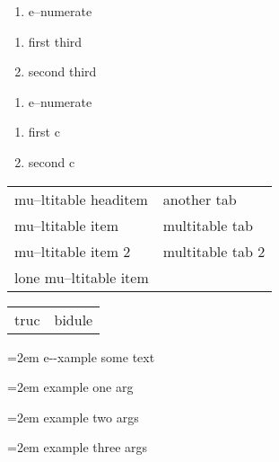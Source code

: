 \documentclass{book}
\begin{document}
\begin{titlepage}
\begin{enumerate}[start=1]
\item e--numerate
\end{enumerate}

\begin{enumerate}[start=3]
\item first third
\item second third
\end{enumerate}

\begin{enumerate}[label=\alph*.]
\item e--numerate
\end{enumerate}

\begin{enumerate}[label=\alph*.,start=3]
\item first c
\item second c
\end{enumerate}

\begin{tabular}{m{} m{}}%
mu--ltitable headitem &another tab\\
mu--ltitable item &multitable tab\\
mu--ltitable item 2 &multitable tab 2
\index[cp]{index entry within multitable}%
\\
lone mu--ltitable item&\\
\end{tabular}%

\begin{tabular}{m{} m{}}%
truc &bidule\\
\end{tabular}%

\par\begingroup\obeylines\obeyspaces\frenchspacing\leftskip=2em\relax\parskip=0pt\relax\ttfamily{}%
e{-}{-}xample  some
   text
\endgroup{}%

\par\begingroup\obeylines\obeyspaces\frenchspacing\leftskip=2em\relax\parskip=0pt\relax\ttfamily{}%
example one arg
\endgroup{}%

\par\begingroup\obeylines\obeyspaces\frenchspacing\leftskip=2em\relax\parskip=0pt\relax\ttfamily{}%
example two args
\endgroup{}%

\par\begingroup\obeylines\obeyspaces\frenchspacing\leftskip=2em\relax\parskip=0pt\relax\ttfamily{}%
example three args
\endgroup{}%


\end{titlepage}
\end{document}
